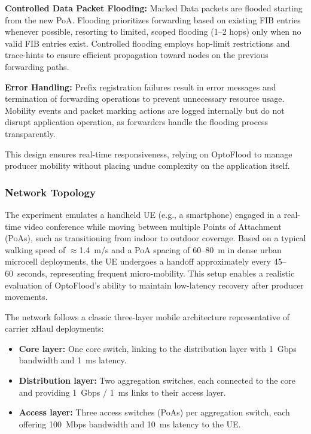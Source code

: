 \documentclass[conference]{IEEEtran}
\begin{document}
\textbf{Controlled Data Packet Flooding:}
Marked Data packets are flooded starting from the new PoA. Flooding prioritizes forwarding based on existing FIB entries whenever possible, resorting to limited, scoped flooding (1–2 hops) only when no valid FIB entries exist. Controlled flooding employs hop-limit restrictions and trace-hints to ensure efficient propagation toward nodes on the previous forwarding paths.

\textbf{Error Handling:}
Prefix registration failures result in error messages and termination of forwarding operations to prevent unnecessary resource usage. Mobility events and packet marking actions are logged internally but do not disrupt application operation, as forwarders handle the flooding process transparently.

This design ensures real-time responsiveness, relying on OptoFlood to manage producer mobility without placing undue complexity on the application itself.

\subsubsection{Network Topology}

The experiment emulates a handheld UE (e.g., a smartphone) engaged in a real-time video conference while moving between multiple Points of Attachment (PoAs), such as transitioning from indoor to outdoor coverage. Based on a typical walking speed of $\approx$1.4~m/s and a PoA spacing of 60--80~m in dense urban microcell deployments, the UE undergoes a handoff approximately every 45--60~seconds, representing frequent micro-mobility. This setup enables a realistic evaluation of OptoFlood’s ability to maintain low-latency recovery after producer movements.

The network follows a classic three-layer mobile architecture representative of carrier xHaul deployments:
\begin{itemize}
    \item \textbf{Core layer:} One core switch, linking to the distribution layer with 1~Gbps bandwidth and 1~ms latency.
    \item \textbf{Distribution layer:} Two aggregation switches, each connected to the core and providing 1~Gbps / 1~ms links to their access layer.
    \item \textbf{Access layer:} Three access switches (PoAs) per aggregation switch, each offering 100~Mbps bandwidth and 10~ms latency to the UE.
\end{itemize}
\end{document}
